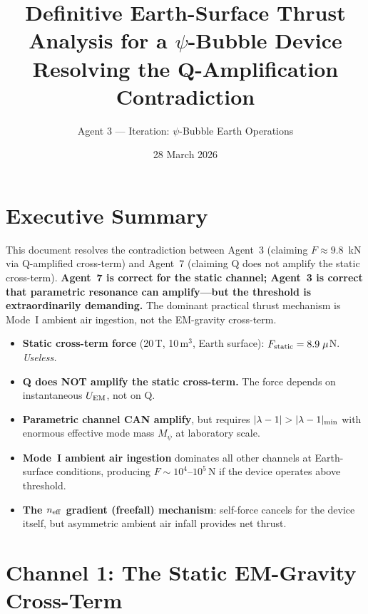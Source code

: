 \documentclass[12pt,letterpaper]{article}
\title{Definitive Earth-Surface Thrust Analysis for a $\psi$-Bubble Device\\
\large Resolving the Q-Amplification Contradiction}
\author{Agent 3 --- Iteration: $\psi$-Bubble Earth Operations}
\date{28 March 2026}
\begin{document}
\maketitle
\tableofcontents

\section{Executive Summary}

This document resolves the contradiction between Agent~3 (claiming $F \approx 9.8$~kN
via Q-amplified cross-term) and Agent~7 (claiming Q does not amplify the static
cross-term). \textbf{Agent~7 is correct for the static channel; Agent~3 is correct
that parametric resonance can amplify---but the threshold is extraordinarily
demanding.} The dominant practical thrust mechanism is Mode~I ambient air
ingestion, not the EM-gravity cross-term.

\begin{tcolorbox}[colback=red!5!white, colframe=red!60!black, title=Bottom Line]
\begin{itemize}
\item \textbf{Static cross-term force} (20\,T, 10\,m$^3$, Earth surface): $F_{\rm static} = 8.9\;\mu$N. \textit{Useless.}
\item \textbf{Q does NOT amplify the static cross-term.} The force depends on instantaneous $U_{\rm EM}$, not on Q.
\item \textbf{Parametric channel CAN amplify}, but requires $|\lambda - 1| > |\lambda - 1|_{\rm min}$ with enormous effective mode mass $M_\psi$ at laboratory scale.
\item \textbf{Mode~I ambient air ingestion} dominates all other channels at Earth-surface conditions, producing $F \sim 10^4$--$10^5$\,N if the device operates above threshold.
\item \textbf{The $n_{\rm eff}$ gradient (freefall) mechanism}: self-force cancels for the device itself, but asymmetric ambient air infall provides net thrust.
\end{itemize}
\end{tcolorbox}

\section{Channel 1: The Static EM-Gravity Cross-Term}
\label{sec:static}
\end{document}
